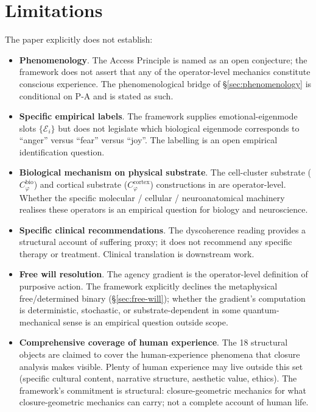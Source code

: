 \documentclass[11pt]{article}
\theoremstyle{plain}
\theoremstyle{definition}
\theoremstyle{remark}
\newcommand{\Cph}{C_\varphi}
\begin{document}
\section{Limitations}\label{sec:limitations}

The paper explicitly does not establish:

\begin{itemize}[leftmargin=2em]
\item \textbf{Phenomenology}. The Access Principle is named as an open conjecture; the framework does not assert that any of the operator-level mechanics constitute conscious experience. The phenomenological bridge of \S\ref{sec:phenomenology} is conditional on P-A and is stated as such.
\item \textbf{Specific empirical labels}. The framework supplies emotional-eigenmode slots $\{\mathcal{E}_i\}$ but does not legislate which biological eigenmode corresponds to ``anger'' versus ``fear'' versus ``joy''. The labelling is an open empirical identification question.
\item \textbf{Biological mechanism on physical substrate}. The cell-cluster substrate ($\Cph^{\mathrm{bio}}$) and cortical substrate ($\Cph^{\mathrm{cortex}}$) constructions in \citet{SmartProcessingToPOV} are operator-level. Whether the specific molecular / cellular / neuroanatomical machinery realises these operators is an empirical question for biology and neuroscience.
\item \textbf{Specific clinical recommendations}. The dyscoherence reading provides a structural account of suffering proxy; it does not recommend any specific therapy or treatment. Clinical translation is downstream work.
\item \textbf{Free will resolution}. The agency gradient is the operator-level definition of purposive action. The framework explicitly declines the metaphysical free/determined binary (\S\ref{sec:free-will}); whether the gradient's computation is deterministic, stochastic, or substrate-dependent in some quantum-mechanical sense is an empirical question outside scope.
\item \textbf{Comprehensive coverage of human experience}. The 18 structural objects are claimed to cover the human-experience phenomena that closure analysis makes visible. Plenty of human experience may live outside this set (specific cultural content, narrative structure, aesthetic value, ethics). The framework's commitment is structural: closure-geometric mechanics for what closure-geometric mechanics can carry; not a complete account of human life.

\end{itemize}
\end{document}
